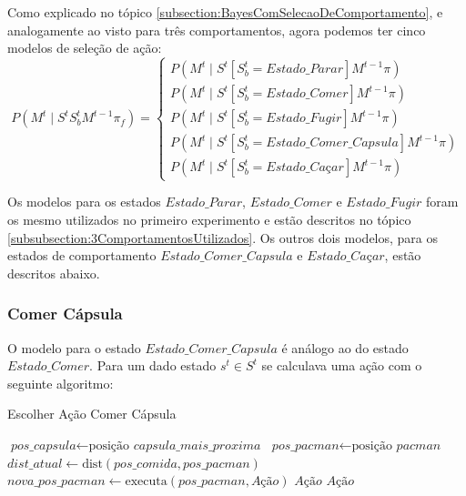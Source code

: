 Como explicado no tópico \ref{subsection:BayesComSelecaoDeComportamento}, e analogamente ao visto para três comportamentos, agora podemos ter cinco modelos de seleção de ação:
\begin{equation}
    P \left( M^t \mid S^t S_b^t M^{t-1} \pi_f \right) = 
        \left\{
            \begin{array}{l}
                P \left( M^t \mid S^t \left[ S_b^t=Estado\_Parar \right] M^{t-1} \pi \right) \\
                P \left( M^t \mid S^t \left[ S_b^t=Estado\_Comer \right] M^{t-1} \pi \right) \\
                P \left( M^t \mid S^t \left[ S_b^t=Estado\_Fugir \right] M^{t-1} \pi \right) \\
                P \left( M^t \mid S^t \left[ S_b^t=Estado\_Comer\_Capsula \right] M^{t-1} \pi \right) \\
                P \left( M^t \mid S^t \left[ S_b^t=\textit{Estado\_Caçar} \right] M^{t-1} \pi \right)
            \end{array}
        \right.
\end{equation}

Os modelos para os estados $ Estado\_Parar $, $ Estado\_Comer $ e $ Estado\_Fugir $ foram os mesmo utilizados no primeiro experimento e estão descritos no tópico \ref{subsubsection:3ComportamentosUtilizados}. Os outros dois modelos, para os estados de comportamento $ Estado\_Comer\_Capsula $ e $ \textit{Estado\_Caçar} $, estão descritos abaixo.

\subsubsection*{Comer Cápsula}

O modelo para o estado $ Estado\_Comer\_Capsula $ é análogo ao do estado $ Estado\_Comer $. Para um dado estado $ s^t \in S^t $ se calculava uma ação com o seguinte algoritmo:

\begin{algorithm}[H]
	\caption{Escolher Ação Comer Cápsula} \label{algorithm:SelecaoDeAcaoComerCápsula}
	\begin{algorithmic}[1]
			\State $\textit{pos\_capsula} \gets \text{posição }\textit{capsula\_mais\_proxima} $
			\State $\textit{pos\_pacman} \gets \text{posição }\textit{pacman} $
			\State $\textit{dist\_atual} \gets \text{dist} \left( \textit{pos\_comida}, \textit{pos\_pacman} \right) $
				\State $\textit{nova\_pos\_pacman} \gets \text{executa} \left( \textit{pos\_pacman}, \textit{Ação} \right) $
					\State \Return $ \textit{Ação} $
				\EndIf 
			\EndFor
			\State \Return $ \textit{Ação} $
		\EndProcedure
	\end{algorithmic}
\end{algorithm}

